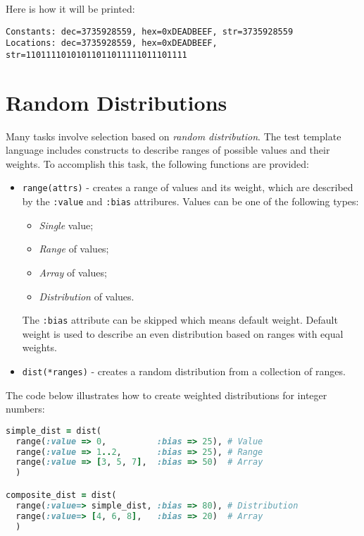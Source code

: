 \documentclass[oneside,final,12pt]{extreport}
\begin{document}
Here is how it will be printed:

\begin{lstlisting}
Constants: dec=3735928559, hex=0xDEADBEEF, str=3735928559
Locations: dec=3735928559, hex=0xDEADBEEF, str=11011110101011011011111011101111
\end{lstlisting}


\section{Random Distributions}
\label{Random_Distributions}

Many tasks involve selection based on \emph{random distribution}. The test template
language includes constructs to describe ranges of possible values and their weights.
To accomplish this task, the following functions are provided:

\begin{itemize}
\item \texttt{range(attrs)} - creates a range of values and its weight, which are 
      described by the \texttt{:value} and \texttt{:bias} attribures. Values can be
      one of the following types:

      \begin{itemize}
      \item \emph{Single} value;
      \item \emph{Range} of values;
      \item \emph{Array} of values;
      \item \emph{Distribution} of values.
      \end{itemize}

      The \texttt{:bias} attribute can be skipped which means default weight. Default weight
      is used to describe an even distribution based on ranges with equal weights.

\item \texttt{dist(*ranges)} - creates a random distribution from a collection of
       ranges.
\end{itemize}

The code below illustrates how to create weighted distributions for integer numbers:

\begin{lstlisting}[language=ruby]
simple_dist = dist(
  range(:value => 0,          :bias => 25), # Value
  range(:value => 1..2,       :bias => 25), # Range
  range(:value => [3, 5, 7],  :bias => 50)  # Array
  )

composite_dist = dist(
  range(:value=> simple_dist, :bias => 80), # Distribution
  range(:value=> [4, 6, 8],   :bias => 20)  # Array
  )
\end{lstlisting} 
\end{document}
